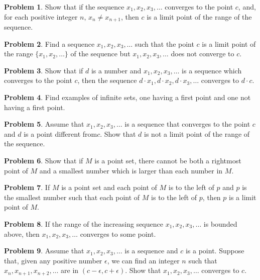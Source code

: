 \documentclass{article}
\theoremstyle{definition}
\newtheorem{problem}{Problem}
\begin{document}
\begin{problem}
Show that if the sequence $x_1, x_2, x_3, \dots$ converges to the point $c$, and, for each positive integer $n$, $x_n \neq x_{n+1}$, then $c$ is a limit point of the range of the sequence.
\end{problem}

\begin{problem}
Find a sequence $x_1, x_2, x_3, \dots$ such that the point $c$ is a limit point of the range $\{x_1, x_2, \dots \}$ of the sequence but $x_1, x_2, x_3, \dots$ does not converge to $c$. 
\end{problem}

\begin{problem}
Show that if $d$ is a number and $x_1, x_2, x_3, \dots$ is a sequence which converges to the point $c$, then the sequence $d \cdot x_1, d \cdot x_2, d \cdot x_3, \dots$ converges to $d \cdot c$.
\end{problem}

\begin{problem}
Find examples of infinite sets, one having a first point and one not having a first point.
\end{problem}

\begin{problem}
Assume that $x_1, x_2, x_3, \dots$ is a sequence that converges to the point $c$ and $d$ is a point different from$c$. Show that $d$ is not a limit point of the range of the sequence.
\end{problem}

\begin{problem}
Show that if $M$ is a point set, there cannot be both a rightmost point of $M$ and a smallest number which is larger than each number in $M$.
\end{problem}

\begin{problem}
If $M$ is a point set and each point of $M$ is to the left of $p$ and $p$ is the smallest number such that each point of $M$ is to the left of $p$, then $p$ is a limit point of $M$.
\end{problem}

\begin{problem}
If the range of the increasing sequence $x_1, x_2, x_3, \dots$ is bounded above, then $x_1, x_2, x_3, \dots$ converges to some point.
\end{problem}

\begin{problem}
Assume that $x_1, x_2, x_3, \dots$ is a sequence and $c$ is a point. Suppose that, given any positive number $\epsilon$, we can find an integer $n$ such that $x_n, x_{n+1}, x_{n+2}, \dots$ are in $(c - \epsilon, c + \epsilon)$. Show that $x_1, x_2, x_3, \dots$ converges to $c$.
\end{problem}
\end{document}
